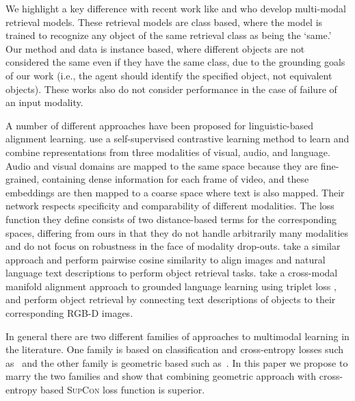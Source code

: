 \documentclass[10pt]{article} %
\newcommand{\todokdinline}[1]{\todo[color=red!20,inline]{{KD: \small #1}}}
\newcommand{\todocmi}[1]{\todo[inline,color=green!40]{\small #1 -- Cynthia}}
\newcommand{\supcon}{\textsc{SupCon}}
\begin{document}
We highlight a key difference with recent work like \citet{10.1145/3397271.3401232} and \citet{10.1145/3331184.3331213} who develop multi-modal retrieval models. These retrieval models are class based, where the model is trained to recognize any object of the same retrieval class as being the `same.' Our method and data is instance based, where different objects are not considered the same even if they have the same class, due to the grounding goals of our work (i.e., the agent should identify the specified object, not equivalent objects). These works also do not consider performance in the case of failure of an input modality. 

A number of different approaches have been proposed for linguistic-based alignment learning. \citet{alayrac2020self} use a self-supervised contrastive learning method to learn and combine representations from three modalities of visual, audio, and language. Audio and visual domains are mapped to the same space because they are fine-grained, containing dense information for each frame of video, and these embeddings are then mapped to a coarse space where text is also mapped. Their network respects specificity and comparability of different modalities. The loss function they define consists of two distance-based terms for the corresponding spaces, differing from ours in that they do not handle arbitrarily many modalities and do not focus on robustness in the face of modality drop-outs. \citet{Nguyen-RSS-20} take a similar approach and perform pairwise cosine similarity to align images and natural language text descriptions to perform object retrieval tasks. \citet{triplet_loss_2021_CVPR} take a cross-modal manifold alignment approach to grounded language learning using triplet loss \citep{Chechik:2010:LSO:1756006.1756042}, and perform object retrieval by connecting text descriptions of objects to their corresponding RGB-D images.

In general there are two different families of approaches to multimodal learning in the literature. One family is based on classification and cross-entropy losses such as~\citet{NEURIPS2020_supervised_contrastive, chen2020simple} and the other family is geometric based such as~\citet{ICML22GeometricMultimodal,Carvalho-cooking-triplet,salvador2017cooking,triplet_loss_2021_CVPR}.
In this paper we propose to marry the two families and show that combining geometric approach with cross-entropy based \supcon{} loss function is superior.

\end{document}
